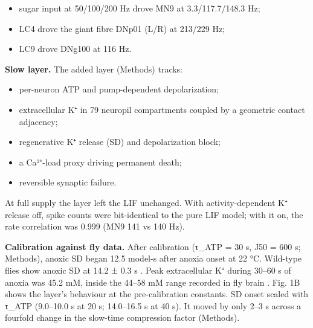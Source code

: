 \documentclass[11pt]{article}
\providecommand{\tightlist}{\setlength{\itemsep}{0pt}\setlength{\parskip}{0pt}}
\begin{document}
\begin{itemize}
\tightlist
\item
  sugar input at 50/100/200 Hz drove MN9 at 3.3/117.7/148.3 Hz;
\item
  LC4 drove the giant fibre DNp01 (L/R) at 213/229 Hz;
\item
  LC9 drove DNg100 at 116 Hz.
\end{itemize}

\textbf{Slow layer.} The added layer (Methods) tracks:

\begin{itemize}
\tightlist
\item
  per-neuron ATP and pump-dependent depolarization;
\item
  extracellular K⁺ in 79 neuropil compartments coupled by a geometric contact adjacency;
\item
  regenerative K⁺ release (SD) and depolarization block;
\item
  a Ca²⁺-load proxy driving permanent death;
\item
  reversible synaptic failure.
\end{itemize}

At full supply the layer left the LIF unchanged. With activity-dependent K⁺ release off, spike counts were bit-identical to the pure LIF model; with it on, the rate correlation was 0.999 (MN9 141 vs 140 Hz).

\textbf{Calibration against fly data.} After calibration (τ\_ATP = 30 s, J50 = 600 s; Methods), anoxic SD began 12.5 model-s after anoxia onset at 22 °C. Wild-type flies show anoxic SD at 14.2 ± 0.3 s \cite{andersen2018}. Peak extracellular K⁺ during 30--60 s of anoxia was 45.2 mM, inside the 44--58 mM range recorded in fly brain \cite{andersen2018,armstrong2011}. Fig. 1B shows the layer's behaviour at the pre-calibration constants. SD onset scaled with τ\_ATP (9.0--10.0 s at 20 s; 14.0--16.5 s at 40 s). It moved by only 2--3 s across a fourfold change in the slow-time compression factor (Methods).
\end{document}
